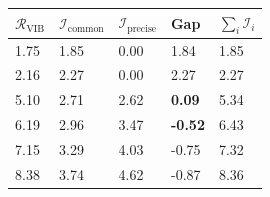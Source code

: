 \begin{tabular}{lllll}
\toprule
$\mathcal R_{\mathrm{VIB}}$ & $\mathcal I_{\mathrm{common}}$ & $\mathcal I_{\mathrm{precise}}$ & Gap & $\sum_i\mathcal I_i$ \\
\midrule
1.75 & 1.85 & 0.00 & 1.84 & 1.85 \\
2.16 & 2.27 & 0.00 & 2.27 & 2.27 \\
5.10 & 2.71 & 2.62 & \textbf{0.09} & 5.34 \\
6.19 & 2.96 & 3.47 & \textbf{-0.52} & 6.43 \\
7.15 & 3.29 & 4.03 & -0.75 & 7.32 \\
8.38 & 3.74 & 4.62 & -0.87 & 8.36 \\
\bottomrule
\end{tabular}
